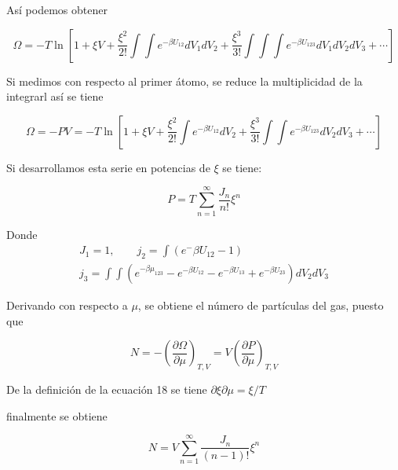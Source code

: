 Así podemos obtener

\begin{equation}
    \Omega = -T \ln \left[
        1 + \xi V + \frac{\xi^2}{2!}
        \int\int e^{-\beta U_{12}}dV_1 dV_2
        + \frac{\xi^3}{3!} \int\int\int e^{-\beta U_{123}}dV_1 dV_2 dV_3
        + \cdots
    \right]
\end{equation}

Si medimos con respecto al primer átomo, se reduce la multiplicidad de
la integrarl así se tiene

\begin{equation}
    \Omega = -PV = -T \ln \left[
        1 + \xi V + \frac{\xi^2}{2!}
        \int e^{-\beta U_{12}}dV_2
        + \frac{\xi^3}{3!} \int\int e^{-\beta U_{123}}dV_2 dV_3
        + \cdots
    \right]
\end{equation}


Si desarrollamos esta serie en potencias de $\xi$ se tiene:

\begin{equation}
    P = T \sum_{n = 1}^{\infty}\frac{J_n}{n!}\xi^n
\end{equation}

Donde
\begin{gather}
    J_1 = 1,\qquad
    j_2 = \int \left(e^-{\beta U_{12} - 1}\right)\\
    j_3 = \int\int(e^{-\beta\mu_{123}} - e^{-\beta U_{12}} - 
        e^{-\beta U_{13}} + e^{-\beta U_{23}}) dV_2 dV_3
\end{gather}

Derivando con respecto a $\mu$, se obtiene el número de partículas del gas,
puesto que

\begin{equation}
    N = - {\left(
        \frac{\partial \Omega}{\partial \mu}
    \right)}_{T, V}
    = V {\left(
        \frac{\partial P}{\partial \mu}
    \right)}_{T, V}
\end{equation}

De la definición de la ecuación 18 se tiene $\partial \xi \partial \mu = \xi/T$

finalmente se obtiene

\begin{equation}
    N = V \sum_{n = 1}^{\infty}\frac{J_n}{(n - 1)!}\xi^n
\end{equation}

